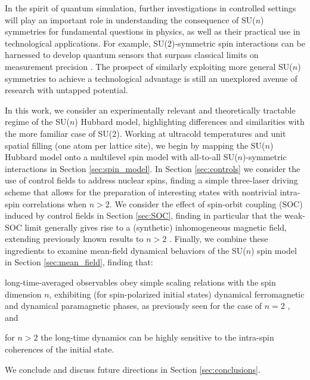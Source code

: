 \documentclass[aps,pra,nofootinbib,twocolumn,superscriptaddress]{revtex4-2}
\newcommand{\1}{\mathds{1}}
\begin{document}
In the spirit of quantum simulation, further investigations in controlled settings will play an important role in understanding the consequence of SU($n$) symmetries for fundamental questions in physics, as well as their practical use in technological applications.
For example, SU(2)-symmetric spin interactions can be harnessed to develop quantum sensors that surpass classical limits on measurement precision \cite{he2019engineering, perlin2020spin}.
The prospect of similarly exploiting more general SU($n$) symmetries to achieve a technological advantage is still an unexplored avenue of research with untapped potential.

In this work, we consider an experimentally relevant and theoretically tractable regime of the SU($n$) Hubbard model, highlighting differences and similarities with the more familiar case of SU(2).
Working at ultracold temperatures and unit spatial filling (one atom per lattice site), we begin by mapping the SU($n$) Hubbard model onto a multilevel spin model with all-to-all SU($n$)-symmetric interactions in Section \ref{sec:spin_model}.
In Section \ref{sec:controls} we consider the use of control fields to address nuclear spins, finding a simple three-laser driving scheme that allows for the preparation of interesting states with nontrivial intra-spin correlations when $n>2$.
We consider the effect of spin-orbit coupling (SOC) induced by control fields in Section \ref{sec:SOC}, finding in particular that the weak-SOC limit generally gives rise to a (synthetic) inhomogeneous magnetic field, extending previously known results to $n>2$ \cite{mancini2015observation, wall2016synthetic, livi2016synthetic, kolkowitz2016spinorbitcoupled, bromley2018dynamics, he2019engineering}.
Finally, we combine these ingredients to examine mean-field dynamical behaviors of the SU($n$) spin model in Section \ref{sec:mean_field}, finding that:
\begin{enumerate*}
\item long-time-averaged observables obey simple scaling relations with the spin dimension $n$, exhibiting (for spin-polarized initial states) dynamical ferromagnetic and dynamical paramagnetic phases, as previously seen for the case of $n=2$ \cite{smale2019observation, lewis-swan2021cavityqed}, and
\item for $n>2$ the long-time dynamics can be highly sensitive to the intra-spin coherences of the initial state.
\end{enumerate*}
We conclude and discuss future directions in Section \ref{sec:conclusions}.
\end{document}
